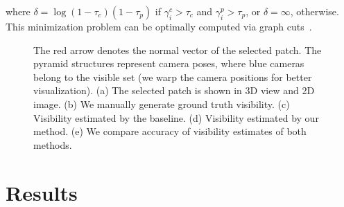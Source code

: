 \documentclass[10pt,twocolumn,letterpaper]{article}
\begin{document}
where $\delta = \log(1-\tau_c)(1-\tau_p)$  if $\gamma_i^c > \tau_c$ and $\gamma_i^p>\tau_p$, or $\delta=\infty$, otherwise. This minimization problem can be optimally computed via graph cuts~\cite{boykov2001fast}. 

\begin{figure*}[ht]
  \centering       
 	\caption{The red arrow denotes the normal vector of the selected patch. The pyramid structures represent camera poses, where blue cameras belong to the visible set (we warp the camera positions for better visualization). (a) The selected patch is shown in 3D view and 2D image. (b) We manually generate ground truth visibility. (c) Visibility estimated by the baseline. (d) Visibility estimated by our method. (e) We compare accuracy of visibility estimates of both methods.} 
  \label{Fig:visibilityError}
\end{figure*}

\section{Results}





\end{document}
